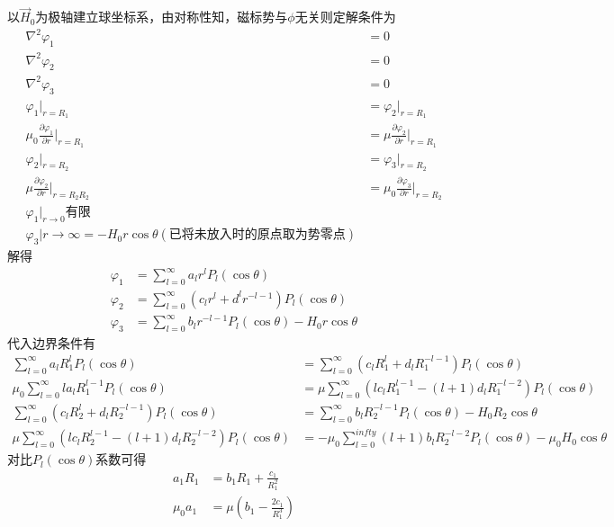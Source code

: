 \documentclass{phyasgn}
\begin{document}
\begin{sol}[6]
    以$\vec{H}_0$为极轴建立球坐标系，由对称性知，磁标势与$\phi$无关则定解条件为
    \begin{align*}
        \nabla^2\varphi_1&=0\\
        \nabla^2\varphi_2&=0\\
        \nabla^2\varphi_3&=0\\
        \varphi_1|_{r=R_1}&=\varphi_2|_{r=R_1}\\
        \mu_0\frac{\partial \varphi_1}{\partial r}|_{r=R_1}&=\mu\frac{\partial \varphi_2}{\partial r}|_{r=R_1}\\
        \varphi_2|_{r=R_2}&=\varphi_3|_{r=R_2}\\
        \mu\frac{\partial \varphi_2}{\partial r}|_{r=R_2R_2}&=\mu_0\frac{\partial \varphi_3}{\partial r}|_{r=R_2}\\
        \varphi_1|_{r\to 0}\text{有限}\\
        \varphi_3|{r\to\infty}=-H_0r\cos\theta(\text{已将未放入时的原点取为势零点})
    \end{align*}
    解得
    \begin{align*}
        \varphi_1&=\sum_{l=0}^{\infty}a_lr^lP_l(\cos\theta)\\
        \varphi_2&=\sum_{l=0}^{\infty}(c_lr^l+d^lr^{-l-1})P_l(\cos\theta)\\
        \varphi_3&=\sum_{l=0}^{\infty}b_lr^{-l-1}P_l(\cos\theta)-H_0r\cos\theta
    \end{align*}
    代入边界条件有
    \begin{align*}
        \sum_{l=0}^{\infty}a_lR_1^lP_l(\cos\theta)&=\sum_{l=0}^{\infty}(c_lR_1^l+d_lR_1^{-l-1})P_l(\cos\theta)\\
        \mu_0\sum_{l=0}^{\infty}la_lR_1^{l-1}P_l(\cos\theta)&=\mu\sum_{l=0}^{\infty}(lc_lR_1^{l-1}-(l+1)d_lR_1^{-l-2})P_l(\cos\theta)\\
        \sum_{l=0}^{\infty}(c_lR_2^l+d_lR_2^{-l-1})P_l(\cos\theta)&=\sum_{l=0}^{\infty}b_lR_2^{-l-1}P_l(\cos\theta)-H_0R_2\cos\theta\\
        \mu\sum_{l=0}^{\infty}(lc_lR_2^{l-1}-(l+1)d_lR_2^{-l-2})P_l(\cos\theta)&=-\mu_0\sum_{l=0}^{infty}(l+1)b_lR_2^{-l-2}P_l(\cos\theta)-\mu_0H_0\cos\theta
    \end{align*}
    对比$P_l(\cos\theta)$系数可得
    \begin{align*}
        a_1R_1&=b_1R_1+\frac{c_1}{R_1^2}\\
        \mu_0a_1&=\mu(b_1-\frac{2c_1}{R_1^3})\\

\end{align*}
\end{sol}
\end{document}
